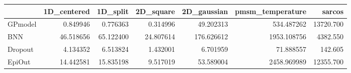 \begin{tabular}{lrrrrrr}
\toprule
{} &  1D\_centered &   1D\_split &  2D\_square &  2D\_gaussian &  pmsm\_temperature &     sarcos \\
\midrule
GPmodel &     0.849946 &   0.776363 &   0.314996 &    49.202313 &        534.487262 &  13720.700 \\
BNN     &    46.518656 &  65.122400 &  24.807614 &   176.626612 &       1953.108756 &   4382.550 \\
Dropout &     4.134352 &   6.513824 &   1.432001 &     6.701959 &         71.888557 &    142.605 \\
EpiOut  &    14.442581 &  15.835198 &   9.517019 &    53.589004 &       2458.969989 &  12355.700 \\
\bottomrule
\end{tabular}
